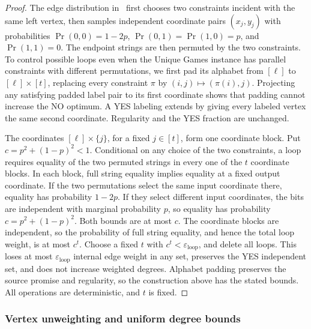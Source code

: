 \begin{proof}
The edge distribution in~\cite[proof of Theorem~3.1]{AKS2011} first chooses two
constraints incident with the same left vertex, then samples
independent coordinate pairs $(x_j,y_j)$ with probabilities
$\Pr(0,0)=1-2p$, $\Pr(0,1)=\Pr(1,0)=p$, and $\Pr(1,1)=0$.
The endpoint strings are then permuted by the two constraints.
To control possible loops even when the Unique Games instance has
parallel constraints with different permutations, we first pad its
alphabet from $[\ell]$ to $[\ell]\times[t]$, replacing every
constraint $\pi$ by $(i,j)\mapsto(\pi(i),j)$.
Projecting any satisfying padded label pair to its first coordinate
shows that padding cannot increase the NO optimum. A YES labeling
extends by giving every labeled vertex the same second coordinate.
Regularity and the YES fraction are unchanged.

The coordinates $[\ell]\times\{j\}$, for a fixed $j\in[t]$,
form one coordinate block. Put $c=p^2+(1-p)^2<1$. Conditional on any choice of the two
constraints, a loop requires equality of the two permuted strings
in every one of the $t$ coordinate blocks. In each block, full
string equality implies equality at a fixed output coordinate. If
the two permutations select the same input coordinate there, equality
has probability $1-2p$. If they select different input coordinates,
the bits are independent with marginal probability $p$, so equality
has probability $c=p^2+(1-p)^2$. Both bounds are at most $c$.
The coordinate blocks are independent, so the probability of full
string equality, and hence the total loop weight, is at most $c^t$.
Choose a fixed $t$ with $c^t<\varepsilon_{\mathrm{loop}}$, and delete all loops.
This loses at most $\varepsilon_{\mathrm{loop}}$ internal edge weight in any set,
preserves the YES independent set, and does not increase weighted
degrees. Alphabet padding preserves the source promise and
regularity, so the construction above has the stated bounds.
All operations are deterministic, and $t$ is fixed.
\end{proof}

\subsubsection{Vertex unweighting and uniform degree bounds}

